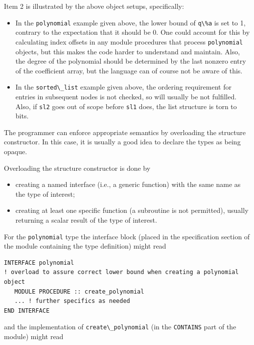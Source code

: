 \documentclass[
  paper=a4,
  ,captions=tableheading
]{scrartcl}
\newcommand{\passthrough}[1]{#1}
\providecommand{\tightlist}{%
  \setlength{\itemsep}{0pt}\setlength{\parskip}{0pt}}
\begin{document}
Item 2 is illustrated by the above object setups, specifically:

\begin{itemize}
\tightlist
\item
  In the \passthrough{\lstinline!polynomial!} example given above, the
  lower bound of \passthrough{\lstinline!q\%a!} is set to 1, contrary to
  the expectation that it should be 0. One could account for this by
  calculating index offsets in any module procedures that process
  \passthrough{\lstinline!polynomial!} objects, but this makes the code
  harder to understand and maintain. Also, the degree of the polynomial
  should be determined by the last nonzero entry of the coefficient
  array, but the language can of course not be aware of this.
\item
  In the \passthrough{\lstinline!sorted\_list!} example given above, the
  ordering requirement for entries in subsequent nodes is not checked,
  so will usually be not fulfilled. Also, if
  \passthrough{\lstinline!sl2!} goes out of scope before
  \passthrough{\lstinline!sl1!} does, the list structure is torn to
  bits.
\end{itemize}

The programmer can enforce appropriate semantics by overloading the
structure constructor. In this case, it is usually a good idea to
declare the types as being opaque.

Overloading the structure constructor is done by

\begin{itemize}
\tightlist
\item
  creating a named interface (i.e., a generic function) with the same
  name as the type of interest;
\item
  creating at least one specific function (a subroutine is not
  permitted), usually returning a scalar result of the type of interest.
\end{itemize}

For the \passthrough{\lstinline!polynomial!} type the interface block
(placed in the specification section of the module containing the type
definition) might read

\begin{lstlisting}
INTERFACE polynomial
! overload to assure correct lower bound when creating a polynomial object
   MODULE PROCEDURE :: create_polynomial
   ... ! further specifics as needed
END INTERFACE
\end{lstlisting}

and the implementation of \passthrough{\lstinline!create\_polynomial!}
(in the \passthrough{\lstinline!CONTAINS!} part of the module) might
read
\end{document}
